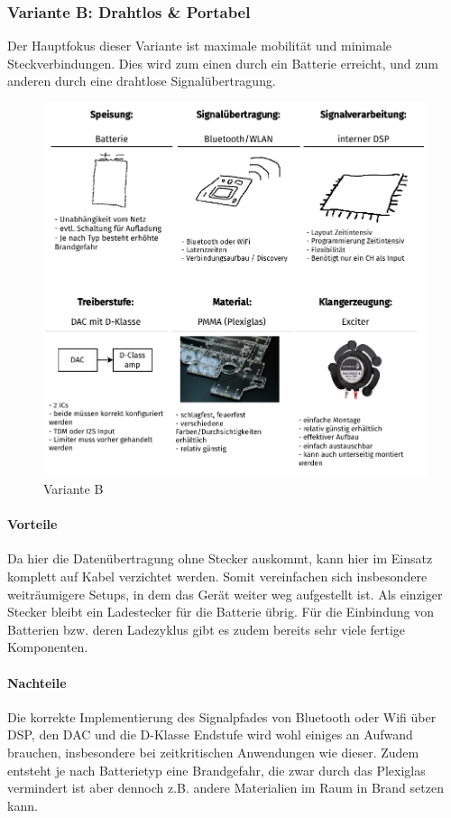 \subsubsection{Variante B: Drahtlos \& Portabel}
Der Hauptfokus dieser Variante ist maximale mobilität und minimale Steckverbindungen. Dies wird zum einen durch ein Batterie erreicht, und zum anderen durch eine drahtlose Signalübertragung.
\begin{figure}[H]
	\centering
	\includegraphics{pictures/VarianteB_drahtlosPortabel.pdf}
	\caption{Variante B}
\end{figure}
\paragraph{Vorteile} Da hier die Datenübertragung ohne Stecker auskommt, kann hier im Einsatz komplett auf Kabel verzichtet werden. Somit vereinfachen sich insbesondere weiträumigere Setups, in dem das Gerät weiter weg aufgestellt ist. Als einziger Stecker bleibt ein Ladestecker für die Batterie übrig. Für die Einbindung von Batterien bzw. deren Ladezyklus gibt es zudem bereits sehr viele fertige Komponenten.
\paragraph{Nachteile} Die korrekte Implementierung des Signalpfades von Bluetooth oder Wifi über DSP, den DAC und die D-Klasse Endstufe wird wohl einiges an Aufwand brauchen, insbesondere bei zeitkritischen Anwendungen wie dieser. Zudem entsteht je nach Batterietyp eine Brandgefahr, die zwar durch das Plexiglas vermindert ist aber dennoch z.B. andere Materialien im Raum in Brand setzen kann.
\newpage
